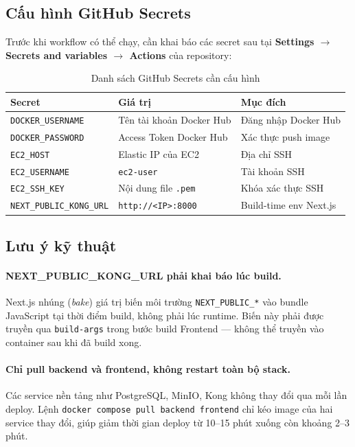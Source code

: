 \subsection{Cấu hình GitHub Secrets}

Trước khi workflow có thể chạy, cần khai báo các secret sau tại
\textbf{Settings $\to$ Secrets and variables $\to$ Actions} của repository:

\begin{table}[H]
\centering
\caption{Danh sách GitHub Secrets cần cấu hình}
\label{tab:github-secrets}
\begin{tabular}{lll}
\hline
\textbf{Secret} & \textbf{Giá trị} & \textbf{Mục đích} \\
\hline
\texttt{DOCKER\_USERNAME}        & Tên tài khoản Docker Hub    & Đăng nhập Docker Hub \\
\texttt{DOCKER\_PASSWORD}        & Access Token Docker Hub     & Xác thực push image \\
\texttt{EC2\_HOST}               & Elastic IP của EC2          & Địa chỉ SSH \\
\texttt{EC2\_USERNAME}           & \texttt{ec2-user}           & Tài khoản SSH \\
\texttt{EC2\_SSH\_KEY}           & Nội dung file \texttt{.pem} & Khóa xác thực SSH \\
\texttt{NEXT\_PUBLIC\_KONG\_URL} & \texttt{http://<IP>:8000}   & Build-time env Next.js \\
\hline
\end{tabular}
\end{table}

\subsection{Lưu ý kỹ thuật}

\paragraph{NEXT\_PUBLIC\_KONG\_URL phải khai báo lúc build.}
Next.js nhúng (\textit{bake}) giá trị biến môi trường
\texttt{NEXT\_PUBLIC\_*} vào bundle JavaScript tại thời điểm build,
không phải lúc runtime. Biến này phải được truyền qua \texttt{build-args}
trong bước build Frontend --- không thể truyền vào container sau khi đã
build xong.

\paragraph{Chỉ pull backend và frontend, không restart toàn bộ stack.}
Các service nền tảng như PostgreSQL, MinIO, Kong không thay đổi qua mỗi
lần deploy. Lệnh \texttt{docker compose pull backend frontend} chỉ kéo
image của hai service thay đổi, giúp giảm thời gian deploy từ 10--15 phút
xuống còn khoảng 2--3 phút.

